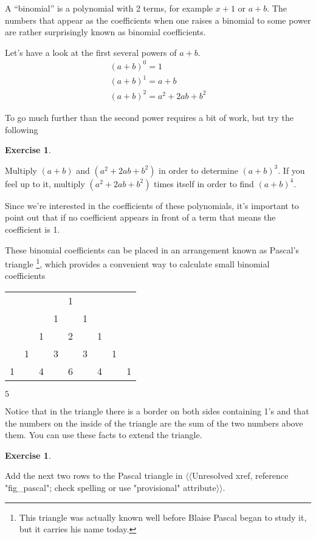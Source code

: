 \documentclass[10pt,]{book}
\theoremstyle{plain}
\theoremstyle{definition}
\theoremstyle{definition}
\newtheorem{exercise}[theorem]{Exercise}
\numberwithin{equation}{section}
\begin{document}
      A ``binomial'' is a polynomial with 2 terms, for example \(x+1\) or \(a+b\).
      The numbers that appear as the coefficients when one raises a binomial
      to some power are \textemdash{} rather surprisingly \textemdash{} known as
       binomial coefficients.
\par

      Let's have a look at the first several powers of \(a+b\).
      \begin{gather*}
(a+b)^0 = 1\\
(a+b)^1 = a+b\\
(a+b)^2 = a^2 + 2ab + b^2
\end{gather*}
\par

      To go much further than the second power requires a bit of work,
      but try the following
\begin{exercise}\label{exercise-3}

          Multiply \((a+b)\) and \((a^2 + 2ab + b^2)\) in order to determine \((a+b)^3\).
          If you feel up to it, multiply \((a^2 + 2ab + b^2)\) times itself in order
          to find \((a+b)^4\).
\end{exercise}
\par

      Since we're interested in the coefficients of these polynomials, it's important
      to point out that if no coefficient appears in front of a term that means the
      coefficient is 1.
\par

      These binomial coefficients can be placed in an arrangement known as
        Pascal's triangle
      \footnote{This triangle was actually known well before Blaise Pascal 
      began to study it, but it carries his name today.\label{fn-5}}, which
      provides a convenient way to calculate small binomial coefficients
\leavevmode%
\begin{table}
\centering
\begin{tabular}{lllllllll}
&&&&1&&&&\tabularnewline[0pt]
&&&1&&1&&&\tabularnewline[0pt]
&&1&&2&&1&&\tabularnewline[0pt]
&1&&3&&3&&1&\tabularnewline[0pt]
1&&4&&6&&4&&1
\end{tabular}
\(5\)\end{table}
\par

      Notice that in the triangle there is a border on both sides containing
      1's and that the numbers on the inside of the triangle are the sum of the
      two numbers above them. You can use these facts to extend the triangle.
\begin{exercise}\label{exercise-4}

          Add the next two rows to the Pascal triangle in {$\langle\langle$Unresolved xref, reference "fig\_pascal"; check spelling or use "provisional" attribute$\rangle\rangle$}.
\end{exercise}
\par
\end{document}
